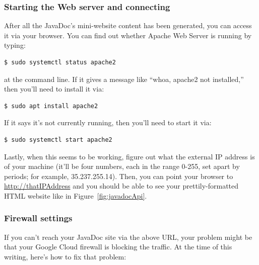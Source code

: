 \subsubsection{Starting the Web server and connecting}

After all the JavaDoc's mini-website content has been generated, you can
access it via your browser. You can find out whether Apache Web Server is
running by typing:

\begin{Verbatim}[fontsize=\small,samepage=true,frame=none]
$ sudo systemctl status apache2
\end{Verbatim}

at the command line. If it gives a message like ``whoa, apache2 not
installed,'' then you'll need to install it via:

\begin{Verbatim}[fontsize=\small,samepage=true,frame=none]
$ sudo apt install apache2
\end{Verbatim}

If it says it's not currently running, then you'll need to start it via:

\begin{Verbatim}[fontsize=\small,samepage=true,frame=none]
$ sudo systemctl start apache2
\end{Verbatim}

Lastly, when this seems to be working, figure out what the external IP address
is of your machine (it'll be four numbers, each in the range 0-255, set apart
by periods; for example, 35.237.255.14). Then, you can point your browser to
\url{http://thatIPAddress} and you should be able to see your
prettily-formatted HTML website like in Figure~\ref{fig:javadocApi}.

\subsubsection{Firewall settings}

If you can't reach your JavaDoc site via the above URL, your problem might be
that your Google Cloud firewall is blocking the traffic. At the time of this
writing, here's how to fix that problem:

